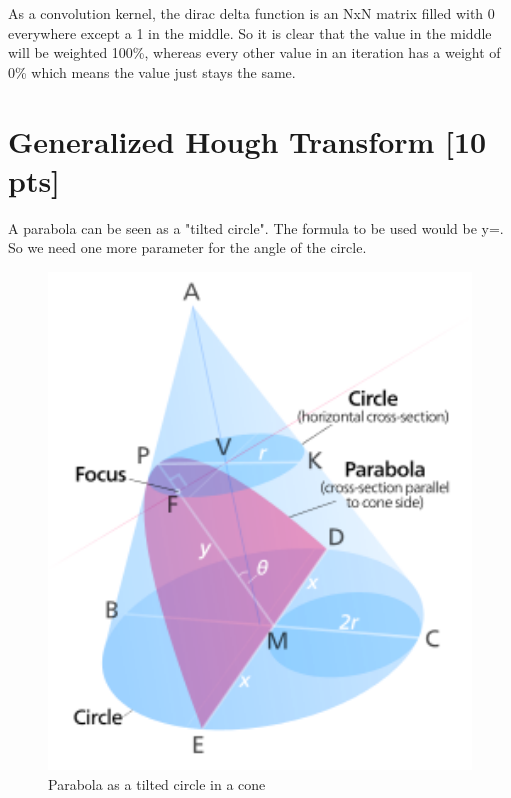 \documentclass[12pt,a4paper]{article}
\begin{document}
As a convolution kernel, the dirac delta function is an NxN matrix filled with 0 everywhere except a 1 in the middle. So it is clear that the value in the middle will be weighted 100\%, whereas every other value in an iteration has a weight of 0\% which means the value just stays the same.


\cite{convolution}


\section{Generalized Hough Transform [10 pts]}

A parabola can be seen as a "tilted circle". The formula to be used would be y={}.
So we need one more parameter for the angle of the circle.

\begin{figure}[!h]
    \begin{center}
        \includegraphics[width=1.0\textwidth]{assets/parabola.png}
        \caption{Parabola as a tilted circle in a cone}
        \label{fig:parabola}
    \end{center}
\end{figure}
\end{document}
